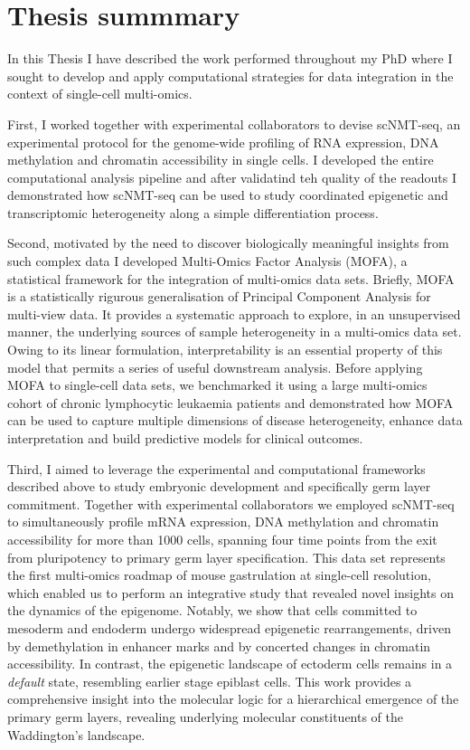 \pagebreak

\section{Thesis summmary}

In this Thesis I have described the work performed throughout my PhD where I sought to develop and apply computational strategies for data integration in the context of single-cell multi-omics.

First, I worked together with experimental collaborators to devise scNMT-seq, an experimental protocol for the genome-wide profiling of RNA expression, DNA methylation and chromatin accessibility in single cells. I developed the entire computational analysis pipeline and after validatind teh quality of the readouts I demonstrated how scNMT-seq can be used to study coordinated epigenetic and transcriptomic heterogeneity along a simple differentiation process.

Second, motivated by the need to discover biologically meaningful insights from such complex data I developed Multi-Omics Factor Analysis (MOFA), a statistical framework for the integration of multi-omics data sets. Briefly, MOFA is a statistically rigurous generalisation of Principal Component Analysis for multi-view data. It provides a systematic approach to explore, in an unsupervised manner, the underlying sources of sample heterogeneity in a multi-omics data set. Owing to its linear formulation, interpretability is an essential property of this model that permits a series of useful downstream analysis. Before applying MOFA to single-cell data sets, we benchmarked it using a large multi-omics cohort of chronic lymphocytic leukaemia patients and demonstrated how MOFA can be used to capture multiple dimensions of disease heterogeneity, enhance data interpretation and build predictive models for clinical outcomes.

Third, I aimed to leverage the experimental and computational frameworks described above to study embryonic development and specifically germ layer commitment. Together with experimental collaborators we employed scNMT-seq to simultaneously profile mRNA expression, DNA methylation and chromatin accessibility for more than 1000 cells, spanning four time points from the exit from pluripotency to primary germ layer specification. This data set represents the first multi-omics roadmap of mouse gastrulation at single-cell resolution, which enabled us to perform an integrative study that revealed novel insights on the dynamics of the epigenome. Notably, we show that cells committed to mesoderm and endoderm undergo widespread epigenetic rearrangements, driven by demethylation in enhancer marks and by concerted changes in chromatin accessibility. In contrast, the epigenetic landscape of ectoderm cells remains in a \textit{default} state, resembling earlier stage epiblast cells. This work provides a comprehensive insight into the molecular logic for a hierarchical emergence of the primary germ layers, revealing underlying molecular constituents of the Waddington's landscape.

